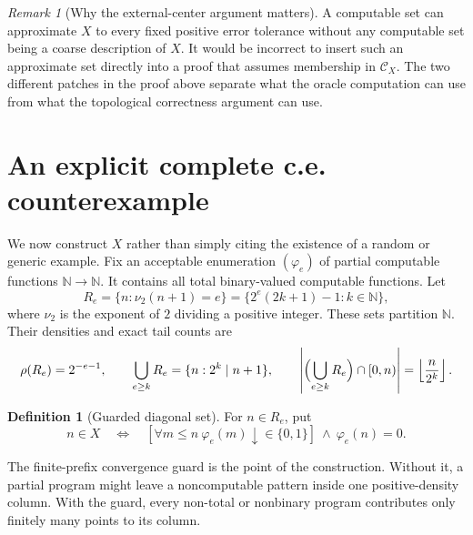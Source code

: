 \documentclass[11pt,a4paper]{article}
\newcommand{\N}{\mathbb N}
\newcommand{\CD}{\mathcal C}
\theoremstyle{definition}\newtheorem{definition}[theorem]{Definition}
\theoremstyle{remark}\newtheorem{remark}[theorem]{Remark}
\begin{document}
\begin{remark}[Why the external-center argument matters]
A computable set can approximate $X$ to every fixed positive error tolerance
without any computable set being a coarse description of $X$. It would be
incorrect to insert such an approximate set directly into a proof that assumes
membership in $\CD_X$. The two different patches in the proof above separate
what the oracle computation can use from what the topological correctness
argument can use.
\end{remark}

\section{An explicit complete c.e. counterexample}
\label{sec:diagonal}
We now construct $X$ rather than simply citing the existence of a random or
generic example. Fix an acceptable enumeration $(\varphi_e)$ of partial
computable functions $\N\to\N$. It contains all total binary-valued computable
functions. Let
\begin{equation}\label{eq:columns}
 R_e=\{n:\nu_2(n+1)=e\}
     =\{2^e(2k+1)-1:k\in\N\},
\end{equation}
where $\nu_2$ is the exponent of $2$ dividing a positive integer. These sets
partition $\N$. Their densities and exact tail counts are
\begin{equation}\label{eq:column-densities}
 \rho(R_e)=2^{-e-1},\qquad
 \bigcup_{e\ge k}R_e=\{n:2^k\mid n+1\},\qquad
 \left|\Bigl(\bigcup_{e\ge k}R_e\Bigr)\cap[0,n)\right|
     =\left\lfloor\frac n{2^k}\right\rfloor.
\end{equation}

\begin{definition}[Guarded diagonal set]\label{def:X}
For $n\in R_e$, put
\begin{equation}\label{eq:explicit-X}
 n\in X\quad\Longleftrightarrow\quad
 \left[\forall m\le n\ \varphi_e(m)\downarrow\in\{0,1\}\right]
 \ \land\ \varphi_e(n)=0.
\end{equation}
\end{definition}

The finite-prefix convergence guard is the point of the construction. Without
it, a partial program might leave a noncomputable pattern inside one
positive-density column. With the guard, every non-total or nonbinary program
contributes only finitely many points to its column.
\end{document}
